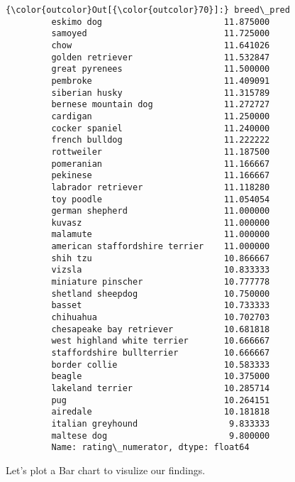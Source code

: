 \documentclass[11pt]{article}
\begin{document}
\begin{Verbatim}[commandchars=\\\{\}]
{\color{outcolor}Out[{\color{outcolor}70}]:} breed\_pred
         eskimo dog                        11.875000
         samoyed                           11.725000
         chow                              11.641026
         golden retriever                  11.532847
         great pyrenees                    11.500000
         pembroke                          11.409091
         siberian husky                    11.315789
         bernese mountain dog              11.272727
         cardigan                          11.250000
         cocker spaniel                    11.240000
         french bulldog                    11.222222
         rottweiler                        11.187500
         pomeranian                        11.166667
         pekinese                          11.166667
         labrador retriever                11.118280
         toy poodle                        11.054054
         german shepherd                   11.000000
         kuvasz                            11.000000
         malamute                          11.000000
         american staffordshire terrier    11.000000
         shih tzu                          10.866667
         vizsla                            10.833333
         miniature pinscher                10.777778
         shetland sheepdog                 10.750000
         basset                            10.733333
         chihuahua                         10.702703
         chesapeake bay retriever          10.681818
         west highland white terrier       10.666667
         staffordshire bullterrier         10.666667
         border collie                     10.583333
         beagle                            10.375000
         lakeland terrier                  10.285714
         pug                               10.264151
         airedale                          10.181818
         italian greyhound                  9.833333
         maltese dog                        9.800000
         Name: rating\_numerator, dtype: float64
\end{Verbatim}
            
    Let's plot a Bar chart to visulize our findings.
\end{document}
